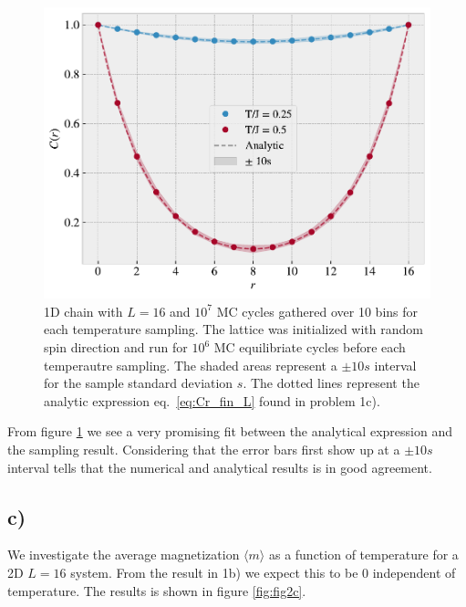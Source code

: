 \documentclass[reprint, amsmath, amssymb, aps, onecolumn]{revtex4-2}
\begin{document}
{{\begin{figure}[H]
  \centering
  \includegraphics[width=0.6\linewidth]{figures/fig2b.pdf}
  \caption{1D chain with $L = 16$ and $10^7$ MC cycles gathered over 10 bins for each temperature sampling. The lattice was initialized with random spin direction and run for $10^6$ MC equilibriate cycles before each temperautre sampling. The shaded areas represent a $\pm 10 s$ interval for the sample standard deviation $s$. The dotted lines represent the analytic expression eq.~\eqref{eq:Cr_fin_L} found in problem 1c).}
  \label{fig:fig2b}
\end{figure}

From figure \ref{fig:fig2b} we see a very promising fit between the analytical expression and the sampling result. Considering that the error bars first show up at a $\pm 10s$ interval tells that the numerical and analytical results is in good agreement. 

\clearpage
\subsection*{c)}
\noindent We investigate the average magnetization $\langle m \rangle$ as a function of temperature for a 2D $L=16$ system. From the result in 1b) we expect this to be 0 independent of temperature. The results is shown in figure \ref{fig:fig2c}.

}}
\end{document}
